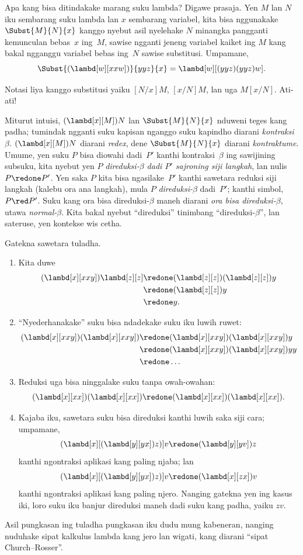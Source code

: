 \documentclass[../../../include/open-logic-section]{subfiles}
\begin{document}

Apa kang bisa ditindakake marang suku lambda?
Digawe prasaja. Yen $M$ lan $N$ iku
sembarang suku lambda lan $x$ sembarang variabel,
kita bisa nggunakake $\Subst{M}{N}{x}$ kanggo
nyebut asil nyelehake $N$ minangka pangganti kemunculan bebas~$x$ ing~$M$,
sawise ngganti jeneng variabel kaiket ing $M$
kang bakal ngganggu variabel bebas ing~$N$
sawise substitusi. Umpamane,
\[
\Subst{(\lambd[w][xxw])}{yyz}{x} = \lambd[w][(yyz)(yyz)w].
\]

\begin{digress}
Notasi liya kanggo substitusi yaiku $[N/x]M$,
$[x/N]M$, lan uga $M[x/N]$. Ati-ati!
\end{digress}

Miturut intuisi, $(\lambd[x][M])N$ lan
$\Subst{M}{N}{x}$ nduweni teges kang padha;
tumindak ngganti suku kapisan nganggo suku
kapindho diarani \emph{kontraksi~$\beta$}.
$(\lambd[x][M])N$ diarani \emph{redex},
dene $\Subst{M}{N}{x}$ diarani
\emph{kontraktume}. Umume, yen suku $P$
bisa diowahi dadi~$P'$ kanthi kontraksi~$\beta$
ing sawijining subsuku, kita nyebut yen $P$
\emph{direduksi-$\beta$ dadi $P'$ sajroning
siji langkah}, lan nulis $P \redone P'$.
Yen saka $P$ kita bisa ngasilake~$P'$
kanthi sawetara reduksi siji langkah
(kalebu ora ana langkah), mula $P$
\emph{direduksi-$\beta$} dadi~$P'$;
kanthi simbol, $P \red P'$. Suku kang
ora bisa direduksi-$\beta$ maneh diarani
\emph{ora bisa direduksi-$\beta$},
utawa \emph{normal-$\beta$}. Kita bakal
nyebut ``direduksi'' tinimbang
``direduksi-$\beta$'', lan sateruse,
yen kontekse wis cetha.

Gatekna sawetara tuladha.
\begin{enumerate}
\item Kita duwe
\begin{align*}
(\lambd[x][xxy]) \lambd[z][z] & \redone (\lambd[z][z])(\lambd[z][z]) y \\
& \redone (\lambd[z][z]) y \\
& \redone y.
\end{align*}
\item ``Nyederhanakake'' suku bisa ndadekake
  suku iku luwih ruwet:
\begin{align*}
(\lambd[x][xxy])(\lambd[x][xxy]) & \redone (\lambd[x][xxy])(\lambd[x][xxy])y \\
& \redone (\lambd[x][xxy])(\lambd[x][xxy])yy \\
& \redone \dots
\end{align*}
\item Reduksi uga bisa ninggalake suku tanpa
  owah-owahan:
\[
(\lambd[x][xx])(\lambd[x][xx]) \redone (\lambd[x][xx])(\lambd[x][xx]).
\]
\item Kajaba iku, sawetara suku bisa direduksi
  kanthi luwih saka siji cara; umpamane,
\[
(\lambd[x][(\lambd[y][yx]) z)] v \redone (\lambd[y][yv]) z
\]
kanthi ngontraksi aplikasi kang paling njaba; lan
\[
(\lambd[x][(\lambd[y][yx]) z)] v \redone (\lambd[x][zx]) v
\]
kanthi ngontraksi aplikasi kang paling njero.
Nanging gatekna yen ing kasus iki, loro suku
iku banjur direduksi maneh dadi suku kang
padha, yaiku $zv$.
\end{enumerate}

Asil pungkasan ing tuladha pungkasan iku
dudu mung kabeneran, nanging nuduhake
sipat kalkulus lambda kang jero lan wigati,
kang diarani ``sipat Church--Rosser''.
\end{document}

